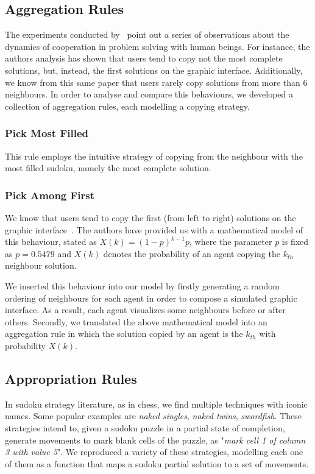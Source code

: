 \documentclass{article}
\begin{document}
\subsection{Aggregation Rules}

The experiments conducted by~\cite{farenzena:collabem} point out a series of observations about the dynamics of cooperation in problem solving with human beings. For instance, the authors analysis has shown that users tend to copy not the most complete solutions, but, instead, the first solutions on the graphic interface. Additionally, we know from this same paper that users rarely copy solutions from more than 6 neighbours. In order to analyse and compare this behaviours, we developed a collection of aggregation rules, each modelling a copying strategy.

\subsubsection{Pick Most Filled}

This rule employs the intuitive strategy of copying from the neighbour with the most filled sudoku, namely the most complete solution.

\subsubsection{Pick Among First}

We know that users tend to copy the first (from left to right) solutions on the graphic interface~\cite{farenzena:collabem}. The authors have provided us with a mathematical model of this behaviour, stated as $X(k) = (1-p)^{k-1}p$, where the parameter $p$ is fixed as $p = 0.5479$ and $X(k)$ denotes the probability of an agent copying the $k_{th}$ neighbour solution.

We inserted this behaviour into our model by firstly generating a random ordering of neighbours for each agent in order to compose a simulated graphic interface. As a result, each agent visualizes some neighbours before or after others. Secondly, we translated the above mathematical model into an aggregation rule in which the solution copied by an agent is the $k_{th}$ with probability $X(k)$.

\subsection{Appropriation Rules}

In sudoku strategy literature, as in chess, we find multiple techniques with iconic names. Some popular examples are {\em naked singles}, {\em naked twins}, {\em swordfish}. These strategies intend to, given a sudoku puzzle in a partial state of completion, generate movements to mark blank cells of the puzzle, as "{\em mark cell 1 of column 3 with value 5}". We reproduced a variety of these strategies, modelling each one of them as a function that maps a sudoku partial solution to a set of movements.
\end{document}
